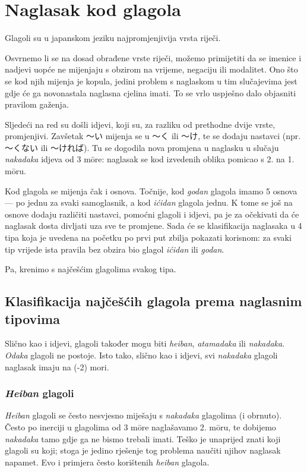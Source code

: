 \documentclass[12pt]{extarticle}
\begin{document}
	\section{Naglasak kod glagola}
	\label{sec:glagoli}
	Glagoli su u japanskom jeziku najpromjenjivija vrsta riječi.
	
	Osvrnemo li se na dosad obrađene vrste riječi, možemo primijetiti da se imenice i nadjevi uopće ne mijenjaju s obzirom na vrijeme, negaciju ili modalitet.
	Ono što se kod njih mijenja je kopula, jedini problem s naglaskom u tim slučajevima jest gdje će ga novonastala naglasna cjelina imati.
	To se vrlo uspješno dalo objasniti pravilom gaženja.
	
	Sljedeći na red su došli idjevi, koji su, za razliku od prethodne dvije vrste, promjenjivi.
	Zavšetak 〜い mijenja se u 〜く ili 〜け, te se dodaju nastavci (npr. 〜くない ili 〜ければ).
	Tu se dogodila nova promjena u naglasku u slučaju \textit{nakadaka} idjeva od 3 m\=ore: naglasak se kod izvedenih oblika pomicao s 2. na 1. m\=oru.
	
	Kod glagola se mijenja čak i osnova.
	Točnije, kod \textit{godan} glagola imamo 5 osnova --- po jednu za svaki samoglasnik, a kod \textit{ićidan} glagola jednu.
	K tome se još na osnove dodaju različiti nastavci, pomoćni glagoli i idjevi, pa je za očekivati da će naglasak dosta divljati uza sve te promjene.
	Sada će se klasifikacija naglasaka u 4 tipa koja je uvedena na početku po prvi put zbilja pokazati korisnom: za svaki tip vrijede ista pravila bez obzira bio glagol \textit{ićidan} ili \textit{godan}.
	
	Pa, krenimo s najčešćim glagolima svakog tipa.
	
	\subsection{Klasifikacija najčešćih glagola prema naglasnim tipovima}
	Slično kao i idjevi, glagoli također mogu biti \textit{heiban}, \textit{atamadaka} ili \textit{nakadaka}.
	\textit{Odaka} glagoli ne postoje.
	Isto tako, slično kao i idjevi, svi \textit{nakadaka} glagoli naglasak imaju na (-2) mori.
	
	\subsubsection*{\textit{Heiban} glagoli}
	\textit{Heiban} glagoli se često nesvjesno miješaju s \textit{nakadaka} glagolima (i obrnuto).
	Često po inerciji u glagolima od 3 m\=ore naglašavamo 2. m\=oru, te dobijemo \textit{nakadaka} tamo gdje ga ne bismo trebali imati.
	Teško je unaprijed znati koji glagoli su koji; stoga je jedino rješenje tog problema naučiti njihov naglasak napamet.
	Evo i primjera često korištenih \textit{heiban} glagola.
	
\end{document}

